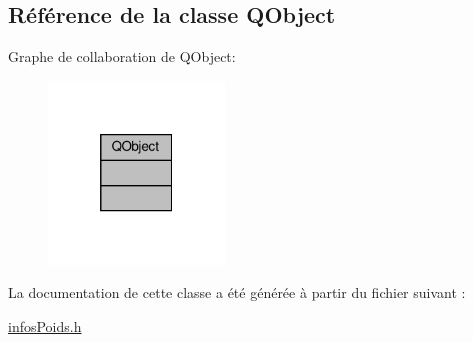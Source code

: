 \hypertarget{class_q_object}{}\subsection{Référence de la classe Q\+Object}
\label{class_q_object}


Graphe de collaboration de Q\+Object\+:\nopagebreak
\begin{figure}[H]
\begin{center}
\leavevmode
\includegraphics[width=133pt]{class_q_object__coll__graph}
\end{center}
\end{figure}


La documentation de cette classe a été générée à partir du fichier suivant \+:\begin{DoxyCompactItemize}
\item 
\hyperlink{infos_poids_8h}{infos\+Poids.\+h}\end{DoxyCompactItemize}
